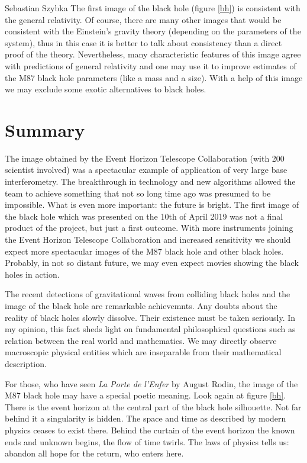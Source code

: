 \begin{artengenv}{Sebastian Szybka}
The first image of the black hole (figure \ref{bh}) is consistent with the general relativity. Of course, there are many other images that would be consistent with the Einstein's gravity theory (depending on the parameters of the system), thus in this case it is better to talk about consistency than a direct proof of the theory. Nevertheless, many characteristic features of this image agree with predictions of general relativity and one may use it to improve estimates of the M87 black hole parameters (like a mass and a size). With a help of this image we may exclude some exotic alternatives to black holes. 

\section{Summary}

The image obtained by the Event Horizon Telescope Collaboration (with 200 scientist involved) was a spectacular example of application of very large base interferometry. The breakthrough in technology and new algorithms allowed the team to achieve something that not so long time ago was presumed to be impossible. What is even more important: the future is bright. The first image of the black hole which was presented on the 10th of April 2019 was not a final product of the project, but just a first outcome. With more instruments joining the Event Horizon Telescope Collaboration and increased sensitivity we should expect more spectacular images of the M87 black hole and other black holes. Probably, in not so distant future, we may even expect  movies showing the black holes in action. 

The recent detections of gravitational waves from colliding black holes and the image of the black hole are remarkable achievemnts. Any doubts about the reality of black holes slowly dissolve. Their existence must be taken seriously. In my opinion, this fact sheds light on fundamental philosophical questions such as relation between the real world and mathematics. We may directly observe macroscopic physical entities which are inseparable from their mathematical description. 

For those, who have seen \textit{La Porte de l'Enfer} by August Rodin, the image of the M87 black hole may have a special poetic meaning. Look again at figure \ref{bh}. There is the event horizon at the central part of the black hole silhouette. Not far behind it a singularity is hidden. The space and time as described by modern physics ceases to exist there. Behind the curtain of the event horizon the known ends and unknown begins, the flow of time twirls. The laws of physics tells us: abandon all hope for the return, who enters here.

\end{artengenv}